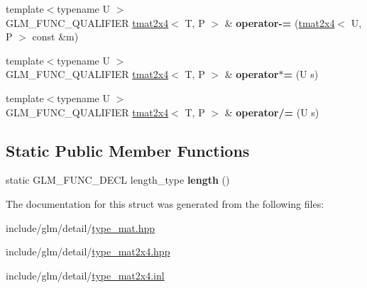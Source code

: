 \begin{DoxyCompactItemize}
{\footnotesize template$<$typename U $>$ }\\G\+L\+M\+\_\+\+F\+U\+N\+C\+\_\+\+Q\+U\+A\+L\+I\+F\+I\+ER \hyperlink{structglm_1_1tmat2x4}{tmat2x4}$<$ T, P $>$ \& {\bfseries operator-\/=} (\hyperlink{structglm_1_1tmat2x4}{tmat2x4}$<$ U, P $>$ const \&m)
\item 
\mbox{\label{structglm_1_1tmat2x4_a0df625aa1e2ff9d3bdcec091cfe49938}} 
{\footnotesize template$<$typename U $>$ }\\G\+L\+M\+\_\+\+F\+U\+N\+C\+\_\+\+Q\+U\+A\+L\+I\+F\+I\+ER \hyperlink{structglm_1_1tmat2x4}{tmat2x4}$<$ T, P $>$ \& {\bfseries operator$\ast$=} (U s)
\item 
\mbox{\label{structglm_1_1tmat2x4_ab5395e4e7c57f59d26790d2d640e4a81}} 
{\footnotesize template$<$typename U $>$ }\\G\+L\+M\+\_\+\+F\+U\+N\+C\+\_\+\+Q\+U\+A\+L\+I\+F\+I\+ER \hyperlink{structglm_1_1tmat2x4}{tmat2x4}$<$ T, P $>$ \& {\bfseries operator/=} (U s)
\end{DoxyCompactItemize}
\subsection*{Static Public Member Functions}
\begin{DoxyCompactItemize}
\item 
\mbox{\label{structglm_1_1tmat2x4_ad8ebd12c7dd9f888960ac95f375d9701}} 
static G\+L\+M\+\_\+\+F\+U\+N\+C\+\_\+\+D\+E\+CL length\+\_\+type {\bfseries length} ()
\end{DoxyCompactItemize}


The documentation for this struct was generated from the following files\+:\begin{DoxyCompactItemize}
\item 
include/glm/detail/\hyperlink{type__mat_8hpp}{type\+\_\+mat.\+hpp}\item 
include/glm/detail/\hyperlink{type__mat2x4_8hpp}{type\+\_\+mat2x4.\+hpp}\item 
include/glm/detail/\hyperlink{type__mat2x4_8inl}{type\+\_\+mat2x4.\+inl}\end{DoxyCompactItemize}
